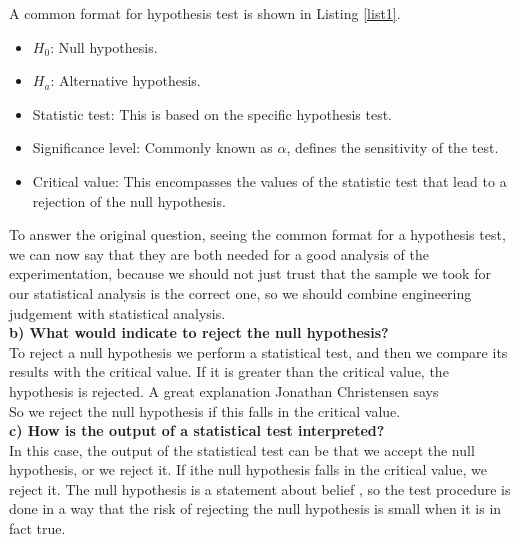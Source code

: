 \documentclass{article}
\begin{document}
A common format for hypothesis test is shown in Listing \ref{list1}.\\

\begin{itemize}\label{list1}
\item $H_0$: Null hypothesis.
\item $H_a$: Alternative hypothesis.
\item Statistic test: This is based on the specific hypothesis test. 
\item Significance level: Commonly known as $\alpha$, defines the sensitivity of the test.
\item Critical value: This encompasses the values of the statistic test that lead to a rejection of the null hypothesis.
\end{itemize}

To answer the original question, seeing the common format for a hypothesis test, we can now say that they are both needed for a good analysis of the experimentation, because we should not just trust that the sample we took for our statistical analysis is the correct one, so we should combine engineering judgement with statistical analysis.\\
 
\textbf{b) What would indicate to reject the null hypothesis?}\\

To reject a null hypothesis we perform a statistical test, and then we compare its results with the critical value. If it is greater than the critical value, the hypothesis is rejected. A great explanation Jonathan Christensen \cite{stack1} says \\

So we reject the null hypothesis if this falls in the critical value.\\

\textbf{c) How is the output of a statistical test interpreted?}\\

In this case, the output of the statistical test can be that we accept the null hypothesis, or we reject it. If ithe null hypothesis falls in the critical value, we reject it. The null hypothesis is a statement about belief \cite{montgomery2009}, so the test procedure is done in a way that the risk of rejecting the null hypothesis is small when it is in fact true. \\
\end{document}
